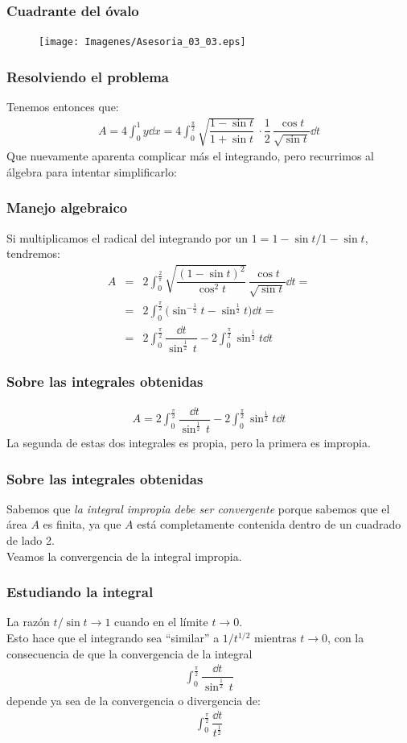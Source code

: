 \begin{frame}
\frametitle{Cuadrante del óvalo}
\begin{figure}
    \centering
    \texttt{[image: Imagenes/Asesoria\_03\_03.eps]}
\end{figure}
\end{frame}
\begin{frame}
\frametitle{Resolviendo el problema}
Tenemos entonces que:
\begin{align*}
A = 4 \int_{0}^{1} y \dd{x} =  4 \int_{0}^{\frac{\pi}{2}} \sqrt{{\dfrac{1 - \sin t}{1 + \sin t}}} \, \cdot \dfrac{1}{2} \, \dfrac{\cos t}{\sqrt{\sin t}} \dd{t}
\end{align*}
\pause
Que nuevamente aparenta complicar más el integrando, pero recurrimos al álgebra para intentar simplificarlo:
\end{frame}
\begin{frame}
\frametitle{Manejo algebraico}
Si multiplicamos el radical del integrando por un $1 = 1 - \sin t / 1 - \sin t$, tendremos:
\begin{eqnarray*}
A &=& 2 \int_{0}^{\frac{2}{\pi}} \sqrt{\dfrac{(1 - \sin t)^{2}}{\cos^{2} t}} \, \dfrac{\cos t}{\sqrt{\sin t}} \dd{t} = \\[1em]
&=& 2 \int_{0}^{\frac{\pi}{2}} \big( \sin^{-\frac{1}{2}} t - \sin^{\frac{1}{2}} t \big) \dd{t} = \\[1em]
&=& 2 \int_{0}^{\frac{\pi}{2}} \dfrac{\dd{t}}{\sin^{\frac{1}{2} } \, t} - 2 \int_{0}^{\frac{\pi}{2}} \sin^{\frac{1}{2}} t \dd{t}
\end{eqnarray*}
\end{frame}
\begin{frame}
\frametitle{Sobre las integrales obtenidas}
\begin{align*}
A = 2 \int_{0}^{\frac{\pi}{2}} \dfrac{\dd{t}}{\sin^{\frac{1}{2} } \, t} - 2 \int_{0}^{\frac{\pi}{2}} \sin^{\frac{1}{2}} t \dd{t}
\end{align*}
La segunda de estas dos integrales es propia, pero la primera es impropia.
\end{frame}
\begin{frame}
\frametitle{Sobre las integrales obtenidas}
Sabemos que \emph{la integral impropia debe ser convergente} porque sabemos que el área $A$ es finita, ya que $A$ está completamente contenida dentro de un cuadrado de lado 2.
\\
\bigskip
\pause
Veamos la convergencia de la integral impropia.
\end{frame}
\begin{frame}
\frametitle{Estudiando la integral}
La razón $t/\sin t \to 1$ cuando en el límite $t \to 0$.
\\
\bigskip
\pause
Esto hace que el integrando sea \enquote{similar} a $1 / t^{1/2}$ mientras $t \to 0$, con la consecuencia de que la convergencia de la integral
\begin{align*}
\int_{0}^{\frac{\pi}{2}} \dfrac{\dd{t}}{\sin^{\frac{1}{2}} \, t}
\end{align*}
depende ya sea de la convergencia o divergencia de:
\begin{align*}
\int_{0}^{\frac{\pi}{2}} \dfrac{\dd{t}}{t^{\frac{1}{2}}}
\end{align*}
\end{frame}
